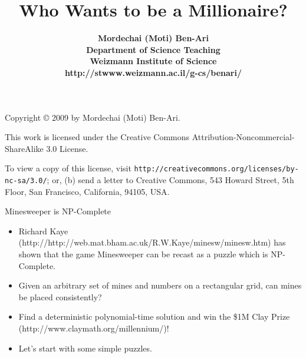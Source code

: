 \documentclass[style=fyma,size=12pt]{powerdot}
\title{\vspace*{-1cm}\sffamily\bfseries\Large 
Who Wants to be a Millionaire?}
\author{\sffamily\bfseries\normalsize Mordechai (Moti) Ben-Ari\\
\sffamily\bfseries\normalsize Department of Science Teaching\\
\sffamily\bfseries\normalsize Weizmann Institute of Science\\
\sffamily\bfseries\normalsize
http://stwww.weizmann.ac.il/g-cs/benari/}
\date{}
\begin{document}
\maketitle
{}

\begin{wideslide}{}
Copyright \copyright{} 2009 by Mordechai (Moti) Ben-Ari.

\bigskip
\bigskip
\bigskip

This work is licensed under the Creative Commons Attribution-Noncommercial-ShareAlike 3.0
License.

\bigskip

To view a copy of this license, visit
\texttt{http://creativecommons.org/licenses/by-nc-sa/3.0/}; or, (b) send a letter
to Creative Commons, 543 Howard Street, 5th Floor, San Francisco,
California, 94105, USA.
\end{wideslide}

\begin{wideslide}{Minesweeper is NP-Complete}
\begin{itemize}
\item \textsf{Richard Kaye (http://http://web.mat.bham.ac.uk/R.W.Kaye/minesw/minesw.htm)
has shown that the game Minesweeper can be recast as a puzzle
which is NP-Complete.}
\item \textsf{Given an arbitrary set of mines and numbers on a rectangular grid,
can mines be placed consistently?}
\item \textsf{Find a deterministic polynomial-time solution and win the \$1M
Clay Prize (http://www.claymath.org/millennium/)!}
\item \textsf{Let's start with some simple puzzles.}
\end{itemize}
\end{wideslide}
\end{document}
